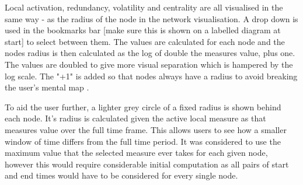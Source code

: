 Local activation, redundancy, volatility and centrality are all visualised in the same way - as the radius of the node in the network visualisation. A drop down is used in the bookmarks bar [make sure this is shown on a labelled diagram at start] to select between them. The values are calculated for each node and the nodes radius is then calculated as the log of double the measures value, plus one. The values are doubled to give more visual separation which is hampered by the log scale. The "+1" is added so that nodes always have a radius to avoid breaking the user's mental map \cite{}.

To aid the user further, a lighter grey circle of a fixed radius is shown behind each node. It's radius is calculated given the active local measure as that measures value over the full time frame. This allows users to see how a smaller window of time differs from the full time period. It was considered to use the maximum value that the selected measure ever takes for each given node, however this would require considerable initial computation as all pairs of start and end times would have to be considered for every single node.
